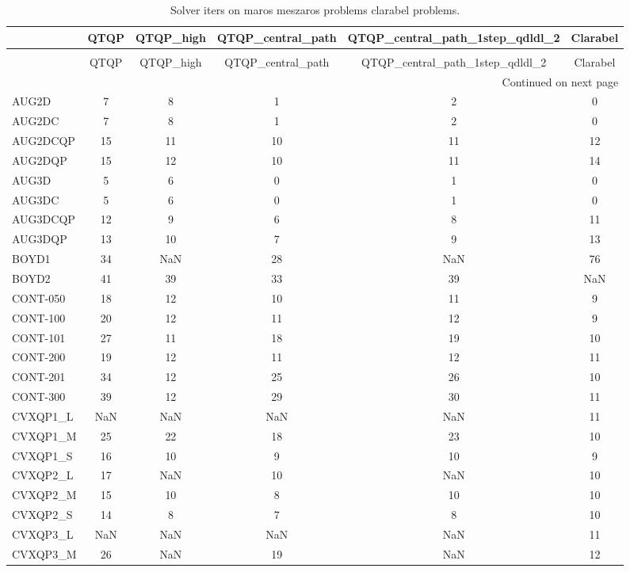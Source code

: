 \begin{longtable}{lccccc}
\caption{Solver iters on maros meszaros problems clarabel problems.} \label{t-maros meszaros problems clarabel-iters} \\
\toprule
 & QTQP & QTQP_high & QTQP_central_path & QTQP_central_path_1step_qdldl_2 & Clarabel \\
\midrule
\endfirsthead
\caption[]{Solver iters on maros meszaros problems clarabel problems.} \\
\toprule
 & QTQP & QTQP_high & QTQP_central_path & QTQP_central_path_1step_qdldl_2 & Clarabel \\
\midrule
\endhead
\midrule
\multicolumn{6}{r}{Continued on next page} \\
\midrule
\endfoot
\bottomrule
\endlastfoot
AUG2D & 7 & 8 & 1 & 2 & 0 \\
AUG2DC & 7 & 8 & 1 & 2 & 0 \\
AUG2DCQP & 15 & 11 & 10 & 11 & 12 \\
AUG2DQP & 15 & 12 & 10 & 11 & 14 \\
AUG3D & 5 & 6 & 0 & 1 & 0 \\
AUG3DC & 5 & 6 & 0 & 1 & 0 \\
AUG3DCQP & 12 & 9 & 6 & 8 & 11 \\
AUG3DQP & 13 & 10 & 7 & 9 & 13 \\
BOYD1 & 34 & NaN & 28 & NaN & 76 \\
BOYD2 & 41 & 39 & 33 & 39 & NaN \\
CONT-050 & 18 & 12 & 10 & 11 & 9 \\
CONT-100 & 20 & 12 & 11 & 12 & 9 \\
CONT-101 & 27 & 11 & 18 & 19 & 10 \\
CONT-200 & 19 & 12 & 11 & 12 & 11 \\
CONT-201 & 34 & 12 & 25 & 26 & 10 \\
CONT-300 & 39 & 12 & 29 & 30 & 11 \\
CVXQP1_L & NaN & NaN & NaN & NaN & 11 \\
CVXQP1_M & 25 & 22 & 18 & 23 & 10 \\
CVXQP1_S & 16 & 10 & 9 & 10 & 9 \\
CVXQP2_L & 17 & NaN & 10 & NaN & 10 \\
CVXQP2_M & 15 & 10 & 8 & 10 & 10 \\
CVXQP2_S & 14 & 8 & 7 & 8 & 10 \\
CVXQP3_L & NaN & NaN & NaN & NaN & 11 \\
CVXQP3_M & 26 & NaN & 19 & NaN & 12 \\

\end{longtable}
